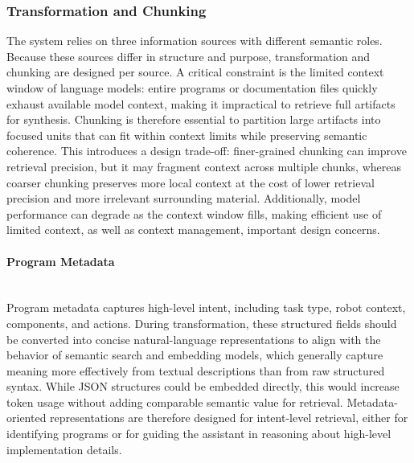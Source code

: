 \subsubsection{Transformation and Chunking}
The system relies on three information sources with different semantic roles. Because these sources differ in structure and purpose, transformation and chunking are designed per source. A critical constraint is the limited context window of language models: entire programs or documentation files quickly exhaust available model context, making it impractical to retrieve full artifacts for synthesis. Chunking is therefore essential to partition large artifacts into focused units that can fit within context limits while preserving semantic coherence. This introduces a design trade-off: finer-grained chunking can improve retrieval precision, but it may fragment context across multiple chunks, whereas coarser chunking preserves more local context at the cost of lower retrieval precision and more irrelevant surrounding material. Additionally, model performance can degrade as the context window fills, making efficient use of limited context, as well as context management, important design concerns. \cite{liu2024lost}

\paragraph{Program Metadata}~\\
Program metadata captures high-level intent, including task type, robot context, components, and actions. During transformation, these structured fields should be converted into concise natural-language representations to align with the behavior of semantic search and embedding models, which generally capture meaning more effectively from textual descriptions than from raw structured syntax. While JSON structures could be embedded directly, this would increase token usage without adding comparable semantic value for retrieval. Metadata-oriented representations are therefore designed for intent-level retrieval, either for identifying programs or for guiding the assistant in reasoning about high-level implementation details.

